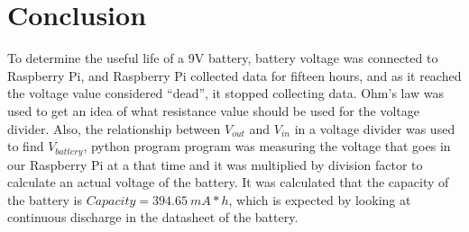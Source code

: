 \section{Conclusion}
To determine the useful life of a 9V battery, battery voltage was connected to Raspberry Pi, and Raspberry Pi collected data for fifteen hours, and as it reached the voltage value considered “dead”, it stopped collecting data. Ohm’s law was used to get an idea of what resistance value should be used for the voltage divider. Also, the relationship between $V_{out}$ and $V_{in}$ in a voltage divider was used to find $V_{battery}$, python program program was measuring the voltage that goes in our Raspberry Pi at a that time and it was multiplied by division factor to calculate an actual voltage of the battery. It was calculated that the capacity of the battery is $Capacity = 394.65 \ mA*h$, which is expected by looking at continuous discharge in the datasheet of the battery.
